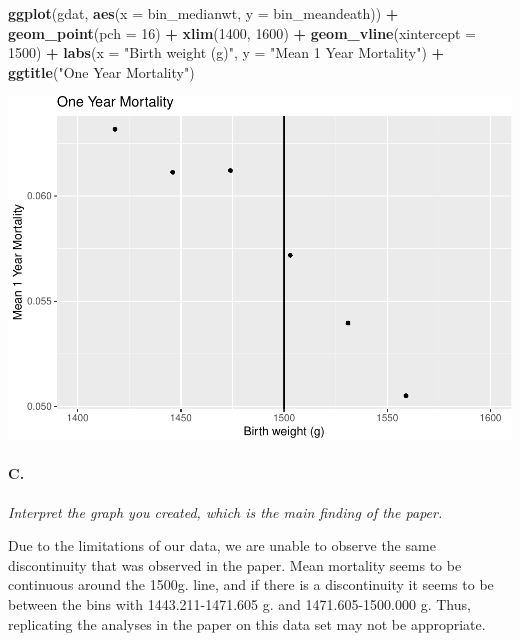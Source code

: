 \documentclass[
]{article}
\newenvironment{Shaded}{\begin{snugshade}}{\end{snugshade}}
\newcommand{\DataTypeTok}[1]{\textcolor[rgb]{0.13,0.29,0.53}{#1}}
\newcommand{\DecValTok}[1]{\textcolor[rgb]{0.00,0.00,0.81}{#1}}
\newcommand{\KeywordTok}[1]{\textcolor[rgb]{0.13,0.29,0.53}{\textbf{#1}}}
\newcommand{\NormalTok}[1]{#1}
\newcommand{\OperatorTok}[1]{\textcolor[rgb]{0.81,0.36,0.00}{\textbf{#1}}}
\newcommand{\StringTok}[1]{\textcolor[rgb]{0.31,0.60,0.02}{#1}}
\begin{document}
\begin{Shaded}
\begin{Highlighting}[]
\KeywordTok{ggplot}\NormalTok{(gdat, }\KeywordTok{aes}\NormalTok{(}\DataTypeTok{x =}\NormalTok{ bin_medianwt, }\DataTypeTok{y =}\NormalTok{ bin_meandeath)) }\OperatorTok{+}
\StringTok{  }\KeywordTok{geom_point}\NormalTok{(}\DataTypeTok{pch =} \DecValTok{16}\NormalTok{) }\OperatorTok{+}
\StringTok{  }\KeywordTok{xlim}\NormalTok{(}\DecValTok{1400}\NormalTok{, }\DecValTok{1600}\NormalTok{) }\OperatorTok{+}\StringTok{ }
\StringTok{  }\KeywordTok{geom_vline}\NormalTok{(}\DataTypeTok{xintercept =} \DecValTok{1500}\NormalTok{) }\OperatorTok{+}
\StringTok{  }\KeywordTok{labs}\NormalTok{(}\DataTypeTok{x =} \StringTok{"Birth weight (g)"}\NormalTok{, }\DataTypeTok{y =} \StringTok{"Mean 1 Year Mortality"}\NormalTok{) }\OperatorTok{+}
\StringTok{  }\KeywordTok{ggtitle}\NormalTok{(}\StringTok{"One Year Mortality"}\NormalTok{)}
\end{Highlighting}
\end{Shaded}

\includegraphics{Pset2_files/figure-latex/unnamed-chunk-5-1.pdf}

\hypertarget{c.-1}{%
\paragraph{C.}\label{c.-1}}

\textit{Interpret the graph you created, which is the main finding of the paper.}

Due to the limitations of our data, we are unable to observe the same
discontinuity that was observed in the paper. Mean mortality seems to be
continuous around the 1500g. line, and if there is a discontinuity it
seems to be between the bins with 1443.211-1471.605 g. and
1471.605-1500.000 g. Thus, replicating the analyses in the paper on this
data set may not be appropriate.
\end{document}
